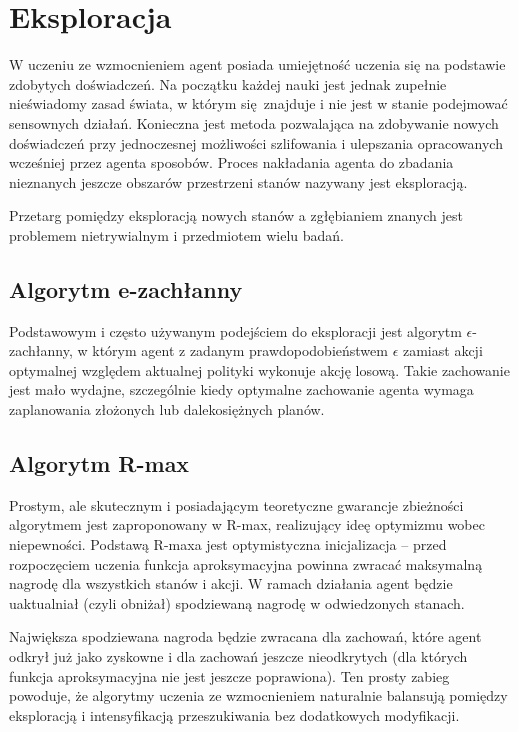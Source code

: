 \section{Eksploracja}
W uczeniu ze wzmocnieniem agent posiada umiejętność uczenia się na podstawie zdobytych doświadczeń. Na początku każdej nauki jest jednak zupełnie nieświadomy zasad świata, w którym się znajduje i nie jest w stanie podejmować sensownych działań. Konieczna jest metoda pozwalająca na zdobywanie nowych doświadczeń przy jednoczesnej możliwości szlifowania i ulepszania opracowanych wcześniej przez agenta sposobów. Proces nakładania agenta do zbadania nieznanych jeszcze obszarów przestrzeni stanów nazywany jest eksploracją.

Przetarg pomiędzy eksploracją nowych stanów a zgłębianiem znanych jest problemem nietrywialnym i przedmiotem wielu badań.

\subsection{Algorytm e-zachłanny}\label{egreedy}
Podstawowym i często używanym podejściem do eksploracji jest algorytm $\epsilon$-zachłanny, w którym agent z zadanym prawdopodobieństwem $\epsilon$ zamiast akcji optymalnej względem aktualnej polityki wykonuje akcję losową. Takie zachowanie jest mało wydajne, szczególnie kiedy optymalne zachowanie agenta wymaga zaplanowania złożonych lub dalekosiężnych planów.

\subsection{Algorytm R-max}
Prostym, ale skutecznym i posiadającym teoretyczne gwarancje zbieżności algorytmem jest zaproponowany w \cite{brafman02} R-max, realizujący ideę optymizmu wobec niepewności. Podstawą R-maxa jest optymistyczna inicjalizacja – przed rozpoczęciem uczenia funkcja aproksymacyjna powinna zwracać maksymalną nagrodę dla wszystkich stanów i akcji. W ramach działania agent będzie uaktualniał (czyli obniżał) spodziewaną nagrodę w odwiedzonych stanach.

Największa spodziewana nagroda będzie zwracana dla zachowań, które agent odkrył już jako zyskowne i dla zachowań jeszcze nieodkrytych (dla których funkcja aproksymacyjna nie jest jeszcze poprawiona). Ten prosty zabieg powoduje, że algorytmy uczenia ze wzmocnieniem naturalnie balansują pomiędzy eksploracją i intensyfikacją przeszukiwania bez dodatkowych modyfikacji.

